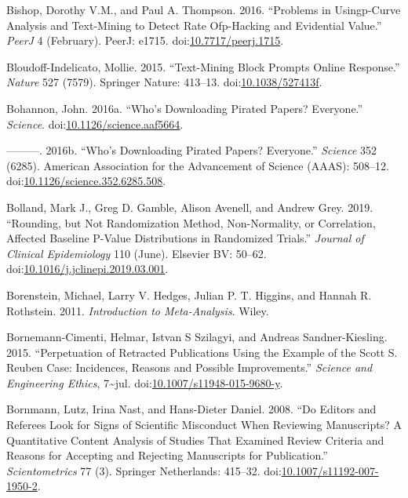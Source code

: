 \documentclass[a5paper]{book}
\begin{document}
\hypertarget{ref-doi:10.7717ux2fpeerj.1715}{}
Bishop, Dorothy V.M., and Paul A. Thompson. 2016. ``Problems in
Usingp-Curve Analysis and Text-Mining to Detect Rate Ofp-Hacking and
Evidential Value.'' \emph{PeerJ} 4 (February). PeerJ: e1715.
doi:\href{https://doi.org/10.7717/peerj.1715}{10.7717/peerj.1715}.

\hypertarget{ref-doi:10.1038ux2f527413f}{}
Bloudoff-Indelicato, Mollie. 2015. ``Text-Mining Block Prompts Online
Response.'' \emph{Nature} 527 (7579). Springer Nature: 413--13.
doi:\href{https://doi.org/10.1038/527413f}{10.1038/527413f}.

\hypertarget{ref-doi:10.1126ux2fscience.aaf5664}{}
Bohannon, John. 2016a. ``Who's Downloading Pirated Papers? Everyone.''
\emph{Science}.
doi:\href{https://doi.org/10.1126/science.aaf5664}{10.1126/science.aaf5664}.

\hypertarget{ref-doi:10.1126ux2fscience.352.6285.508}{}
---------. 2016b. ``Who's Downloading Pirated Papers? Everyone.''
\emph{Science} 352 (6285). American Association for the Advancement of
Science (AAAS): 508--12.
doi:\href{https://doi.org/10.1126/science.352.6285.508}{10.1126/science.352.6285.508}.

\hypertarget{ref-doi:10.1016ux2fj.jclinepi.2019.03.001}{}
Bolland, Mark J., Greg D. Gamble, Alison Avenell, and Andrew Grey. 2019.
``Rounding, but Not Randomization Method, Non-Normality, or Correlation,
Affected Baseline P-Value Distributions in Randomized Trials.''
\emph{Journal of Clinical Epidemiology} 110 (June). Elsevier BV: 50--62.
doi:\href{https://doi.org/10.1016/j.jclinepi.2019.03.001}{10.1016/j.jclinepi.2019.03.001}.

\hypertarget{ref-isbn:9781119964377}{}
Borenstein, Michael, Larry V. Hedges, Julian P. T. Higgins, and Hannah
R. Rothstein. 2011. \emph{Introduction to Meta-Analysis}. Wiley.

\hypertarget{ref-doi:10.1007ux2fs11948-015-9680-y}{}
Bornemann-Cimenti, Helmar, Istvan S Szilagyi, and Andreas
Sandner-Kiesling. 2015. ``Perpetuation of Retracted Publications Using
the Example of the Scott S. Reuben Case: Incidences, Reasons and
Possible Improvements.'' \emph{Science and Engineering Ethics},
7\textasciitilde{}jul.
doi:\href{https://doi.org/10.1007/s11948-015-9680-y}{10.1007/s11948-015-9680-y}.

\hypertarget{ref-doi:10.1007ux2fs11192-007-1950-2}{}
Bornmann, Lutz, Irina Nast, and Hans-Dieter Daniel. 2008. ``Do Editors
and Referees Look for Signs of Scientific Misconduct When Reviewing
Manuscripts? A Quantitative Content Analysis of Studies That Examined
Review Criteria and Reasons for Accepting and Rejecting Manuscripts for
Publication.'' \emph{Scientometrics} 77 (3). Springer Netherlands:
415--32.
doi:\href{https://doi.org/10.1007/s11192-007-1950-2}{10.1007/s11192-007-1950-2}.
\end{document}
